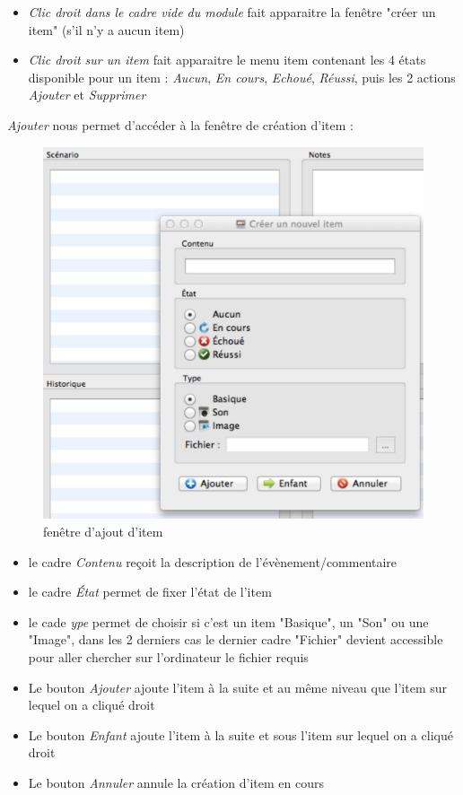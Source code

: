 \documentclass[12pt]{article}
\begin{document}
\begin{itemize}
    \item\emph{Clic droit dans le cadre vide du module} fait apparaitre la fenêtre "créer un item" (s'il n'y a aucun item)
    \item\emph{Clic droit sur un item} fait apparaitre le menu item contenant les 4 états disponible pour un item : \emph{Aucun}, \emph{En cours}, \emph{Echoué}, \emph{Réussi}, puis les 2 actions \emph{Ajouter} et \emph{Supprimer}

\end{itemize}
\emph{Ajouter} nous permet d'accéder à la fenêtre de création d'item :
\begin{figure}
    \includegraphics[scale=0.4]{screen_add_item}
    \caption{fenêtre d'ajout d'item}
\end{figure}
\begin{itemize}
    \item le cadre \emph{Contenu} reçoit la description de l'évènement/commentaire
    \item le cadre \emph{État} permet de fixer l'état de l'item
    \item le cade \emph{ype} permet de choisir si c'est un item "Basique", un "Son" ou une "Image", dans les 2 derniers cas le dernier cadre "Fichier" devient accessible pour aller chercher sur l'ordinateur le fichier requis
    \item Le bouton \emph{Ajouter} ajoute l'item à la suite et au même niveau que l'item sur lequel on a cliqué droit
    \item Le bouton \emph{Enfant} ajoute l'item à la suite et sous l'item sur lequel on a cliqué droit
    \item Le bouton \emph{Annuler} annule la création d'item en cours
\end{itemize}
\end{document}
